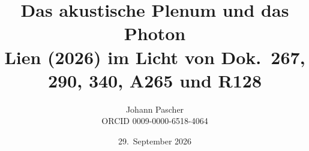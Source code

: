 \documentclass[11pt,a4paper]{report}
\title{Das akustische Plenum und das Photon\\[0.5em]
  \large Lien (2026) im Licht von Dok.~267, 290, 340, A265 und R128}
\date{29.~September 2026}
\author{Johann Pascher\\\small ORCID 0009-0000-6518-4064}
\begin{document}
\renewcommand{\thechapter}{}
\renewcommand{\thesection}{\arabic{section}}
\maketitle
\tableofcontents

\end{document}
